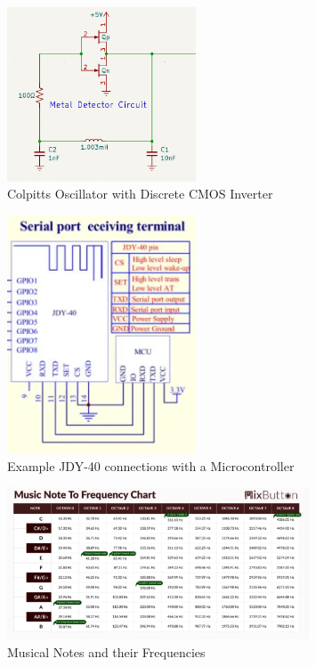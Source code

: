 \documentclass{article}
\begin{document}
\begin{figure}[htbp]
    \centering
    \includegraphics[width=0.5\textwidth]{Figures/metaldetector.png}
    \caption{Colpitts Oscillator with Discrete CMOS Inverter}
    \label{fig:metaldetector}
\end{figure}

\begin{figure}[htbp]
    \centering
    \includegraphics[width=0.5\textwidth]{Figures/jdy40.png}
    \caption{Example JDY-40 connections with a Microcontroller}
    \label{fig:JDY-40}
\end{figure}

\begin{figure}[htbp]
    \centering
    \includegraphics[width=0.8\textwidth]{Figures/Music_Frequencies.png}
    \caption{Musical Notes and their Frequencies}
    \label{fig:music_frequencies}
\end{figure}
\end{document}
